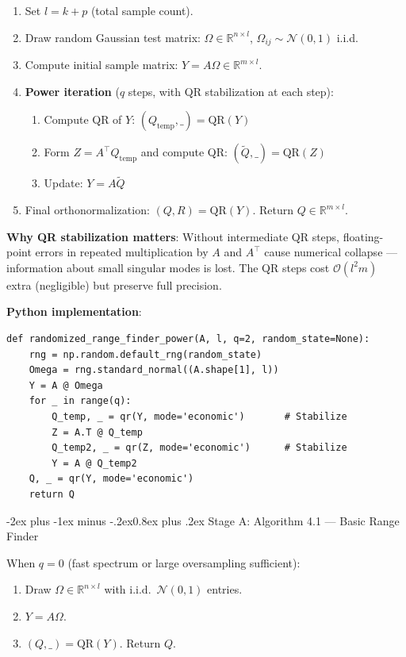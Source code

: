 \documentclass[12pt,a4paper]{article}
\makeatletter
\renewcommand{\subsection}{\@startsection{subsection}{2}{\z@}
  {-2ex plus -1ex minus -.2ex}{0.8ex plus .2ex}
  {\normalsize\bfseries\color{deepblue}}}
\makeatother
\begin{document}
\begin{enumerate}[leftmargin=2em, itemsep=3pt]
  \item Set $l = k + p$ (total sample count).
  \item Draw random Gaussian test matrix:
    $\Omega \in \mathbb{R}^{n \times l}$, $\Omega_{ij} \sim \mathcal{N}(0,1)$ i.i.d.
  \item Compute initial sample matrix: $Y = A\Omega \in \mathbb{R}^{m \times l}$.
  \item \textbf{Power iteration} ($q$ steps, with QR stabilization at each step):
  \begin{enumerate}[label=(\alph*), leftmargin=2em, itemsep=2pt]
    \item Compute QR of $Y$: $(Q_\text{temp}, \_) = \mathrm{QR}(Y)$
    \item Form $Z = A^\top Q_\text{temp}$ and compute QR: $(\tilde{Q}, \_) = \mathrm{QR}(Z)$
    \item Update: $Y = A\tilde{Q}$
  \end{enumerate}
  \item Final orthonormalization: $(Q, R) = \mathrm{QR}(Y)$. Return $Q \in \mathbb{R}^{m \times l}$.
\end{enumerate}

\textbf{Why QR stabilization matters}: Without intermediate QR steps,
floating-point errors in repeated multiplication by $A$ and $A^\top$ cause numerical
collapse --- information about small singular modes is lost. The QR steps cost
$\mathcal{O}(l^2 m)$ extra (negligible) but preserve full precision.

\noindent\textbf{Python implementation}:
\begin{verbatim}
def randomized_range_finder_power(A, l, q=2, random_state=None):
    rng = np.random.default_rng(random_state)
    Omega = rng.standard_normal((A.shape[1], l))
    Y = A @ Omega
    for _ in range(q):
        Q_temp, _ = qr(Y, mode='economic')       # Stabilize
        Z = A.T @ Q_temp
        Q_temp2, _ = qr(Z, mode='economic')      # Stabilize
        Y = A @ Q_temp2
    Q, _ = qr(Y, mode='economic')
    return Q
\end{verbatim}

\subsection{Stage A: Algorithm 4.1 --- Basic Range Finder}

When $q=0$ (fast spectrum or large oversampling sufficient):
\begin{enumerate}[leftmargin=2em, itemsep=2pt]
  \item Draw $\Omega \in \mathbb{R}^{n \times l}$ with i.i.d.\ $\mathcal{N}(0,1)$ entries.
  \item $Y = A\Omega$.
  \item $(Q, \_) = \mathrm{QR}(Y)$. Return $Q$.
\end{enumerate}
\end{document}

